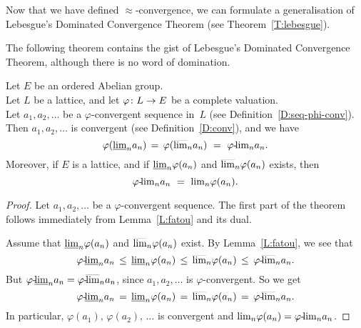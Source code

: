 \documentclass[main.tex]{subfiles}
\begin{document}
\noindent
Now that we have defined $\approx$-convergence,
we can formulate a generalisation of
 Lebesgue's Dominated Convergence Theorem
(see Theorem~\ref{T:lebesgue}).

%
%
\noindent
The following theorem contains the gist
of Lebesgue's Dominated Convergence Theorem,
although there is no word of domination.
\begin{thm}
\label{T:lebesgue}
Let $E$ be an ordered Abelian group.\\
Let $L$ be a lattice,
and let $\varphi\colon L \rightarrow E$ be a 
complete valuation.\\
Let $a_1,a_2,\dotsc$ be a $\varphi$-convergent
sequence in~$L$
(see Definition~\ref{D:seq-phi-conv}). \\
Then $a_1,a_2,\dotsc$ is convergent
(see Definition~\ref{D:conv}),
and we have
\begin{equation*}
\varphi(\llim{n}a_n) \,=\, \varphi(\ulim{n} a_n) 
\ =\ 
\plim\varphi{n} a_n.
\end{equation*}
Moreover,
if $E$ is a lattice,
and if $\smash{\underline{\lim}_{n}}\varphi(a_n)$ and $\smash{\overline{\lim}_{n}}\varphi(a_n)$ exists, 
then
\begin{equation*}
{\varphi}\text{-}\!{\lim}_{n}a_n \ =\ {\lim}_n \varphi(a_n).
\end{equation*}
\end{thm}
\begin{proof}
Let $a_1,a_2,\dotsc$ be a $\varphi$-convergent sequence.
The first part of the theorem follows immediately from Lemma~\ref{L:fatou}
and its dual.

Assume that $\smash{\underline{\lim}_{n}}\varphi(a_n)$ and $\smash{\overline{\lim}_{n}}\varphi(a_n)$ exist.
By Lemma~\ref{L:fatou}, we see that
\begin{equation*}
{\varphi}\text{-}\!\smash{\underline{\lim}_{n}}a_n \,\leq\,
\smash{\underline{\lim}_{n}}\varphi(a_n) \,\leq\,
\smash{\overline{\lim}_{n}}\varphi(a_n) \,\leq\,
{\varphi}\text{-}\!\smash{\overline{\lim}_{n}}a_n.
\end{equation*}
But ${\varphi}\text{-}\!\smash{\underline{\lim}_{n}}a_n = {\varphi}\text{-}\!\smash{\overline{\lim}_{n}}a_n$,
since $a_1,a_2,\dotsc$ is $\varphi$-convergent.
So we get 
\begin{equation*}
{\varphi}\text{-}\!\smash{\underline{\lim}_{n}}a_n \,=\,
\smash{\underline{\lim}_{n}}\varphi(a_n) \,=\,
\smash{\overline{\lim}_{n}}\varphi(a_n) \,=\,
{\varphi}\text{-}\!\smash{\overline{\lim}_{n}}a_n.
\end{equation*}
In particular,
$\varphi(a_1),\,\varphi(a_2),\,\dotsc$
is convergent and ${\lim}_n\varphi(a_n) = {\varphi}\text{-}\!{\lim}_{n}a_n$.
\end{proof}
%
%
\end{document}
